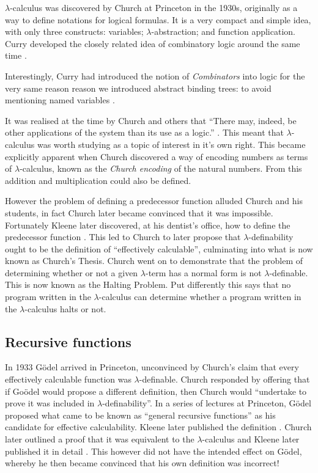 $\lambda$-calculus was discovered by Church at Princeton in the 1930s, originally as a way to define notations for logical formulas.
It is a very compact and simple idea, with only three constructs: variables; $\lambda$-abstraction; and function application.
Curry developed the closely related idea of combinatory logic around the same time \cite{curry1930a, curry1930b}.

Interestingly, Curry had introduced the notion of \emph{Combinators} into logic for the very same reason reason we introduced abstract binding trees: to avoid mentioning named variables \cite{Sorensen}.

It was realised at the time by Church and others that ``There may, indeed, be other applications of the system than its use as a logic.'' \cite{church1932, church1933}.
This meant that $\lambda$-calculus was worth studying as a topic of interest in it's own right.
This became explicitly apparent when Church discovered a way of encoding numbers as terms of $\lambda$-calculus, known as the \emph{Church encoding} of the natural numbers. From this addition and multiplication could also be defined.

However the problem of defining a predecessor function alluded Church and his students, in fact Church later became convinced that it was impossible.
Fortunately Kleene later discovered, at his dentist's office, how to define the predecessor function \cite{kleene1935a, kleene1935b, 4392910}.
This led to Church to later propose that $\lambda$-definability ought to be the definition of ``effectively calculable'', culminating into what is now known as Church's Thesis. Church went on to demonstrate that the problem of determining whether or not a given $\lambda$-term  has a normal form is not $\lambda$-definable.
This is now known as the Halting Problem. Put differently this says that no program written in the $\lambda$-calculus can determine whether a program written in the $\lambda$-calculus halts or not.

\subsection{Recursive functions}

In 1933 G\"odel arrived in Princeton, unconvinced by Church's claim that every effectively calculable function was $\lambda$-definable. Church responded by offering that if Go\"odel would propose a different definition, then Church would ``undertake to prove it was included in $\lambda$-definability''. In a series of lectures at Princeton, G\"odel proposed what came to be known as ``general recursive functions'' as his candidate for effective calculability. Kleene later published the definition \cite{kleene1936}. Church later outlined a proof that it was equivalent to the $\lambda$-calculus \cite{church1936} and Kleene later published it in detail \cite{kleene1936b}. This however did not have the intended effect on G\"odel, whereby he then became convinced that his own definition was incorrect!

